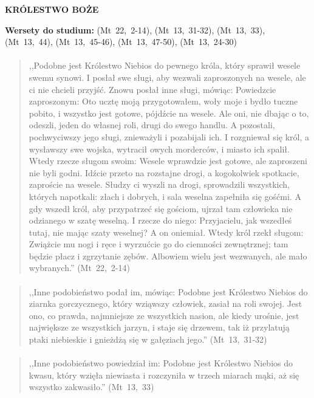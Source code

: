 \documentclass[10pt,a4paper,oneside]{article}
\begin{document}
\centerline{\textbf{\MakeUppercase{Królestwo Boże}}}
\begin{center}
\textbf{Wersety do studium:} 
\mbox{(Mt 22, 2-14)}, \mbox{(Mt 13, 31-32)}, \mbox{(Mt 13, 33)}, \mbox{(Mt 13, 44)}, \mbox{(Mt 13, 45-46)}, \mbox{(Mt 13, 47-50)}, \mbox{(Mt 13, 24-30)}
\end{center}
\paragraph{}
\begin{quote}
,,Podobne jest Królestwo Niebios do pewnego króla, który sprawił wesele swemu synowi. I posłał swe sługi, aby wezwali zaproszonych na wesele, ale ci nie chcieli przyjść. Znowu posłał inne sługi, mówiąc: Powiedzcie zaproszonym: Oto ucztę moją przygotowałem, woły moje i bydło tuczne pobito, i wszystko jest gotowe, pójdźcie na wesele. Ale oni, nie dbając o to, odeszli, jeden do własnej roli, drugi do swego handlu. A pozostali, pochwyciwszy jego sługi, znieważyli i pozabijali ich. I rozgniewał się król, a wysławszy swe wojska, wytracił owych morderców, i miasto ich spalił. Wtedy rzecze sługom swoim: Wesele wprawdzie jest gotowe, ale zaproszeni nie byli godni. Idźcie przeto na rozstajne drogi, a kogokolwiek spotkacie, zaproście na wesele. Słudzy ci wyszli na drogi, sprowadzili wszystkich, których napotkali: złach i dobrych, i sala weselna zapełniła się gośćmi. A gdy wszedł król, aby przypatrzeć się gościom, ujrzał tam człowieka nie odzianego w szatę weselną. I rzecze do niego: Przyjacielu, jak wszedłeś tutaj, nie mając szaty weselnej? A on oniemiał. Wtedy król rzekł sługom: Zwiążcie mu nogi i ręce i wyrzućcie go do ciemności zewnętrznej; tam będzie płacz i zgrzytanie zębów. Albowiem wielu jest wezwanych, ale mało wybranych.'' \mbox{(Mt 22, 2-14)}
\end{quote}
\paragraph{}
\begin{quote}
,,Inne podobieństwo podał im, mówiąc: Podobne jest Królestwo Niebios do ziarnka gorczycznego, który wziąwszy człowiek, zasiał na roli swojej. Jest ono, co prawda, najmniejsze ze wszystkich nasion, ale kiedy urośnie, jest największe ze wszystkich jarzyn, i staje się drzewem, tak iż przylatują ptaki niebieskie i gnieżdżą się w gałęziach jego.'' \mbox{(Mt 13, 31-32)}
\end{quote}
\paragraph{}
\begin{quote}
,,Inne podobieństwo powiedział im: Podobne jest Królestwo Niebios do kwasu, który wzięła niewiasta i rozczyniła w trzech miarach mąki, aż się wszystko zakwasiło.'' \mbox{(Mt 13, 33)}
\end{quote}
\end{document}
